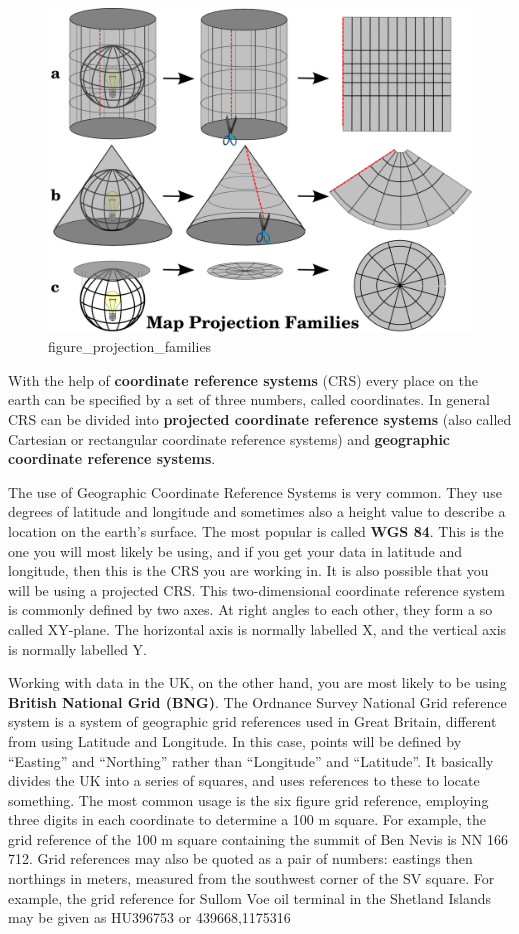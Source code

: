 \documentclass[
]{book}
\begin{document}
\begin{figure}
\centering
\includegraphics{img/projection_families.png}
\caption{figure\_projection\_families}
\end{figure}

With the help of \textbf{coordinate reference systems} (CRS) every place on the earth can be specified by a set of three numbers, called coordinates. In general CRS can be divided into \textbf{projected coordinate reference systems} (also called Cartesian or rectangular coordinate reference systems) and \textbf{geographic coordinate reference systems}.

The use of Geographic Coordinate Reference Systems is very common. They use degrees of latitude and longitude and sometimes also a height value to describe a location on the earth's surface. The most popular is called \textbf{WGS 84}. This is the one you will most likely be using, and if you get your data in latitude and longitude, then this is the CRS you are working in. It is also possible that you will be using a projected CRS. This two-dimensional coordinate reference system is commonly defined by two axes. At right angles to each other, they form a so called XY-plane. The horizontal axis is normally labelled X, and the vertical axis is normally labelled Y.

Working with data in the UK, on the other hand, you are most likely to be using \textbf{British National Grid (BNG)}. The Ordnance Survey National Grid reference system is a system of geographic grid references used in Great Britain, different from using Latitude and Longitude. In this case, points will be defined by ``Easting'' and ``Northing'' rather than ``Longitude'' and ``Latitude''. It basically divides the UK into a series of squares, and uses references to these to locate something. The most common usage is the six figure grid reference, employing three digits in each coordinate to determine a 100 m square. For example, the grid reference of the 100 m square containing the summit of Ben Nevis is NN 166 712. Grid references may also be quoted as a pair of numbers: eastings then northings in meters, measured from the southwest corner of the SV square. For example, the grid reference for Sullom Voe oil terminal in the Shetland Islands may be given as HU396753 or 439668,1175316
\end{document}
